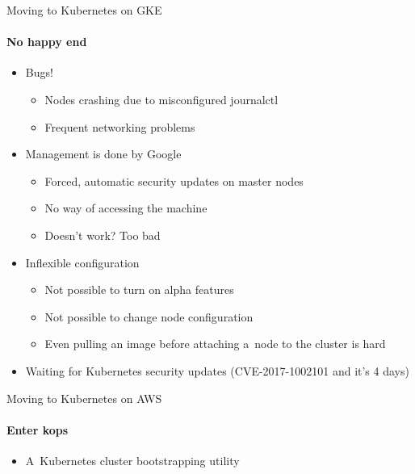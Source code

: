 \documentclass[14pt]{beamer}
\begin{document}
  \begin{frame}{Moving to Kubernetes on GKE}
  \framesubtitle{No happy end}
  \begin{itemize}
    \item Bugs!
    \begin{itemize}
      \item Nodes crashing due to misconfigured journalctl
      \item Frequent networking problems
    \end{itemize}
    \item Management is done by Google
    \begin{itemize}
      \item Forced, automatic security updates on master nodes
      \item No way of accessing the machine
      \item Doesn't work? Too bad
    \end{itemize}
    \item Inflexible configuration
    \begin{itemize}
      \item Not possible to turn on alpha features
      \item Not possible to change node configuration
      \item Even pulling an image before attaching a~node to the cluster is hard
    \end{itemize}
  \item Waiting for Kubernetes security updates (CVE-2017-1002101 and it's 4 days)
  \end{itemize}
  \end{frame}

  \begin{frame}{Moving to Kubernetes on AWS}
  \framesubtitle{Enter kops}
  \begin{itemize}
    \item A~Kubernetes cluster bootstrapping utility
  \end{itemize}
  \end{frame}
\end{document}
